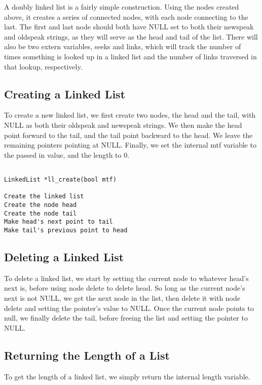 \documentclass[11pt]{article}
\begin{document}
A doubly linked list is a fairly simple construction. Using the nodes created above, it creates a series of connected nodes, with each node connecting to the last. The first and last node should both have NULL set to both their newspeak and oldspeak strings, as they will serve as the head and tail of the list. There will also be two extern variables, seeks and links, which will track the number of times something is looked up in a linked list and the number of links traversed in that lookup, respectively.

\subsection{Creating a Linked List}

To create a new linked list, we first create two nodes, the head and the tail, with NULL as both their oldspeak and newspeak strings. We then make the head point forward to the tail, and the tail point backward to the head. We leave the remaining pointers pointing at NULL. Finally, we set the internal mtf variable to the passed in value, and the length to 0.

\begin{verbatim}

LinkedList *ll_create(bool mtf)

Create the linked list
Create the node head
Create the node tail
Make head's next point to tail
Make tail's previous point to head

\end{verbatim}

\subsection{Deleting a Linked List}

To delete a linked list, we start by setting the current node to whatever head's next is, before using node delete to delete head. So long as the current node's next is not NULL, we get the next node in the list, then delete it with node delete and setting the pointer's value to NULL. Once the current node points to null, we finally delete the tail, before freeing the list and setting the pointer to NULL.

\subsection{Returning the Length of a List}

To get the length of a linked list, we simply return the internal length variable.
\end{document}

